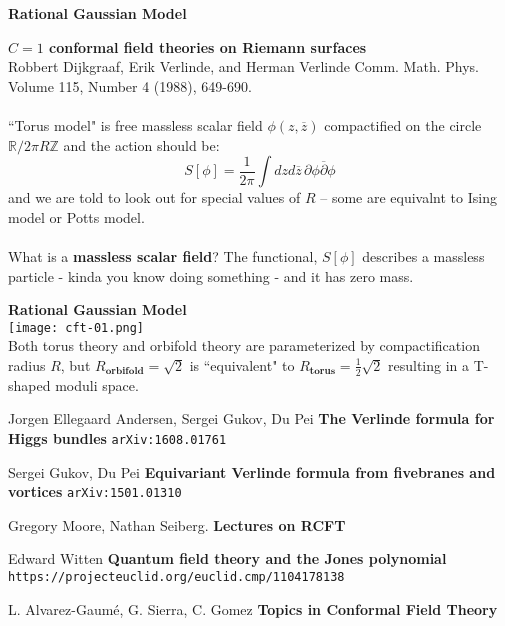 \documentclass[12pt]{article}
\begin{document}
\newpage

\noindent \textbf{Rational Gaussian Model} \newline

\noindent \textbf{$C=1$ conformal field theories on Riemann surfaces} \\
Robbert Dijkgraaf, Erik Verlinde, and Herman Verlinde
Comm. Math. Phys.
Volume 115, Number 4 (1988), 649-690.
\\ \\
``Torus model" is free massless scalar field $\phi(z, \overline{z})$ compactified on the circle $\mathbb{R}/ 2\pi R \mathbb{Z}$ and the action should be:
$$ S[\phi] = \frac{1}{2\pi}\int dz d\overline{z} \, \partial \phi \overline{\partial}\phi$$
and we are told to look out for special values of $R$ -- some are equivalnt to Ising model or Potts model. \\ \\
What is a \textbf{massless scalar field}?  The functional, $S[\phi]$ describes a massless particle - kinda you know doing something - and it has zero mass.

\newpage

\noindent \textbf{Rational Gaussian Model} \\

\texttt{[image: cft-01.png]} \\
Both torus theory and orbifold theory are parameterized by compactification radius $R$, but $R_{\textbf{orbifold}} = \sqrt{2}$ is ``equivalent" to $R_{\textbf{torus}} = \frac{1}{2} \sqrt{2}$ resulting in a T-shaped moduli space.

\newpage


\selectfont \fontsize{12}{10}\selectfont

\begin{thebibliography}{}

\item Jorgen Ellegaard Andersen, Sergei Gukov, Du Pei \textbf{The Verlinde formula for Higgs bundles} \texttt{arXiv:1608.01761
}

\item Sergei Gukov, Du Pei
\textbf{Equivariant Verlinde formula from fivebranes and vortices}
\texttt{arXiv:1501.01310}

\item Gregory Moore, Nathan Seiberg. \textbf{Lectures on RCFT}

\item Edward Witten \textbf{Quantum field theory and the Jones polynomial} \texttt{https://projecteuclid.org/euclid.cmp/1104178138}

\item L. Alvarez-Gaum\'{e}, G. Sierra, C. Gomez \textbf{Topics in Conformal Field Theory}

\end{thebibliography}
\end{document}
